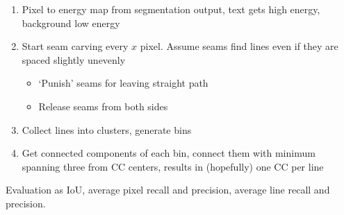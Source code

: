 \begin{enumerate}
		\item Pixel to energy map from segmentation output, text gets high energy, background low energy
		\item Start seam carving every $x$ pixel. Assume seams find lines even
				if they are spaced slightly unevenly
				\begin{itemize}
						\item `Punish' seams for leaving straight path
						\item Release seams from both sides
				\end{itemize}
		\item Collect lines into clusters, generate bins
		\item Get connected components of each bin, connect them with minimum
				spanning three from CC centers, results in (hopefully) one CC
				per line
\end{enumerate}

Evaluation as IoU, average pixel recall and precision, average line recall and
precision.
